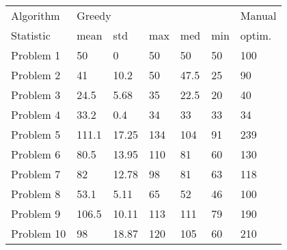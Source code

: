 \begin{tabular}{lllllll}
\toprule
Algorithm & \multicolumn{5}{l}{Greedy} & Manual \\
Statistic &   mean &    std &  max &   med & min & optim. \\
\midrule
Problem 1  &     50 &      0 &   50 &    50 &  50 &    100 \\
Problem 2  &     41 &   10.2 &   50 &  47.5 &  25 &     90 \\
Problem 3  &   24.5 &   5.68 &   35 &  22.5 &  20 &     40 \\
Problem 4  &   33.2 &    0.4 &   34 &    33 &  33 &     34 \\
Problem 5  &  111.1 &  17.25 &  134 &   104 &  91 &    239 \\
Problem 6  &   80.5 &  13.95 &  110 &    81 &  60 &    130 \\
Problem 7  &     82 &  12.78 &   98 &    81 &  63 &    118 \\
Problem 8  &   53.1 &   5.11 &   65 &    52 &  46 &    100 \\
Problem 9  &  106.5 &  10.11 &  113 &   111 &  79 &    190 \\
Problem 10 &     98 &  18.87 &  120 &   105 &  60 &    210 \\
\bottomrule
\end{tabular}
